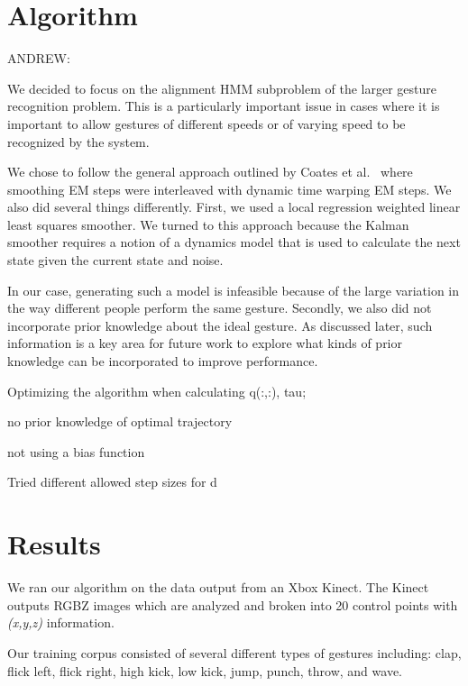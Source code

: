 \documentclass{article}
\begin{document}
\section{Algorithm}

ANDREW:

We decided to focus on the alignment HMM subproblem of the larger gesture
recognition problem. This is a particularly important issue in cases where it is
important to allow gestures of different speeds or of varying speed to be
recognized by the system.

We chose to follow the general approach outlined by Coates et al.\
\cite{Coates2008} where smoothing EM steps were interleaved with dynamic time
warping EM steps. We also did several things differently. First, we used a local
regression weighted linear least squares smoother. We turned to this approach
because the Kalman smoother requires a notion of a dynamics model that is used
to calculate the next state given the current state and noise.

In our case, generating such a model is infeasible because of the large
variation in the way different people perform the same gesture. Secondly, we
also did not incorporate prior knowledge about the ideal gesture. As discussed
later, such information is a key area for future work to explore what kinds of
prior knowledge can be incorporated to improve performance.

Optimizing the algorithm when calculating q(:,:), tau;

no prior knowledge of optimal trajectory

not using a bias function

Tried different allowed step sizes for d

\section{Results}

We ran our algorithm on the data output from an Xbox Kinect. The Kinect outputs
RGBZ images which are analyzed and broken into 20 control points with
\emph{(x,y,z)} information.

Our training corpus consisted of several different types of gestures including:
clap, flick left, flick right, high kick, low kick, jump, punch, throw, and
wave. 
\end{document}
